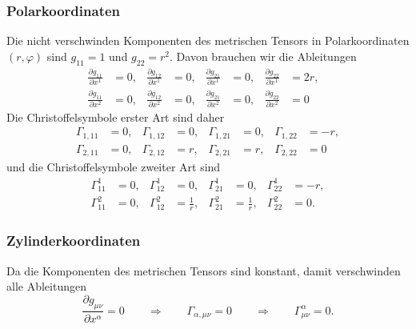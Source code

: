 \subsubsection{Polarkoordinaten}
Die nicht verschwinden Komponenten
des metrischen Tensors in Polarkoordinaten $(r,\varphi)$
sind $g_{11}=1$ und $g_{22}=r^2$.
Davon brauchen wir die Ableitungen
\[
\begin{aligned}
\frac{\partial g_{11}}{\partial x^1} &=0,&
\frac{\partial g_{12}}{\partial x^1} &=0,&
\frac{\partial g_{21}}{\partial x^1} &=0,&
\frac{\partial g_{22}}{\partial x^1} &=2r,&
\\
\frac{\partial g_{11}}{\partial x^2} &=0,&
\frac{\partial g_{12}}{\partial x^2} &=0,&
\frac{\partial g_{21}}{\partial x^2} &=0,&
\frac{\partial g_{22}}{\partial x^2} &=0
\end{aligned}
\]
Die Christoffelsymbole erster Art sind daher 
\[
\begin{aligned}
\Gamma_{1,11} &=  0,&
\Gamma_{1,12} &=  0,&
\Gamma_{1,21} &=  0,&
\Gamma_{1,22} &= -r,
\\
\Gamma_{2,11} &=  0,&
\Gamma_{2,12} &=  r,&
\Gamma_{2,21} &=  r,&
\Gamma_{2,22} &=  0
\end{aligned}
\]
und die Christoffelsymbole zweiter Art sind
\[
\begin{aligned}
\Gamma_{11}^1 &= 0,&
\Gamma_{12}^1 &= 0,&
\Gamma_{21}^1 &= 0,&
\Gamma_{22}^1 &=-r,
\\
\Gamma_{11}^2 &= 0,&
\Gamma_{12}^2 &= \frac1{r},&
\Gamma_{21}^2 &= \frac1{r},&
\Gamma_{22}^2 &= 0.
\end{aligned}
\]

\subsubsection{Zylinderkoordinaten}
Da die Komponenten des metrischen Tensors sind konstant, damit verschwinden
alle Ableitungen
\[
\frac{\partial g_{\mu\nu}}{\partial x^\alpha}=0
\qquad\Rightarrow\qquad
\Gamma_{\alpha,\mu\nu}=0
\qquad\Rightarrow\qquad
\Gamma_{\mu\nu}^\alpha=0.
\]

